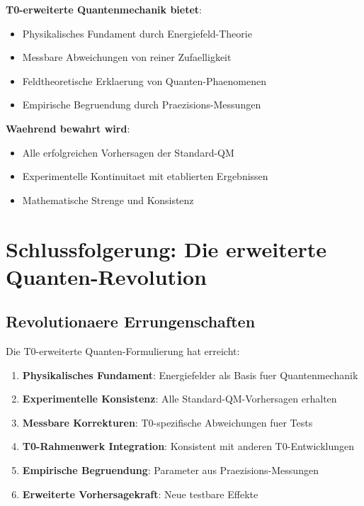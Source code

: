 \documentclass[12pt,a4paper]{article}
\begin{document}
	\begin{tcolorbox}[colback=purple!5!white,colframe=purple!75!black,title=Jenseits der Quanten-Mystik]
		\textbf{T0-erweiterte Quantenmechanik bietet}:
		\begin{itemize}
			\item Physikalisches Fundament durch Energiefeld-Theorie
			\item Messbare Abweichungen von reiner Zufaelligkeit
			\item Feldtheoretische Erklaerung von Quanten-Phaenomenen
			\item Empirische Begruendung durch Praezisions-Messungen
		\end{itemize}
		
		\textbf{Waehrend bewahrt wird}:
		\begin{itemize}
			\item Alle erfolgreichen Vorhersagen der Standard-QM
			\item Experimentelle Kontinuitaet mit etablierten Ergebnissen
			\item Mathematische Strenge und Konsistenz
		\end{itemize}
	\end{tcolorbox}
	
	\section{Schlussfolgerung: Die erweiterte Quanten-Revolution}
	
	\subsection{Revolutionaere Errungenschaften}
	
	Die T0-erweiterte Quanten-Formulierung hat erreicht:
	
	\begin{enumerate}
		\item \textbf{Physikalisches Fundament}: Energiefelder als Basis fuer Quantenmechanik
		\item \textbf{Experimentelle Konsistenz}: Alle Standard-QM-Vorhersagen erhalten
		\item \textbf{Messbare Korrekturen}: T0-spezifische Abweichungen fuer Tests
		\item \textbf{T0-Rahmenwerk Integration}: Konsistent mit anderen T0-Entwicklungen
		\item \textbf{Empirische Begruendung}: Parameter aus Praezisions-Messungen
		\item \textbf{Erweiterte Vorhersagekraft}: Neue testbare Effekte
	\end{enumerate}
	
\end{document}
